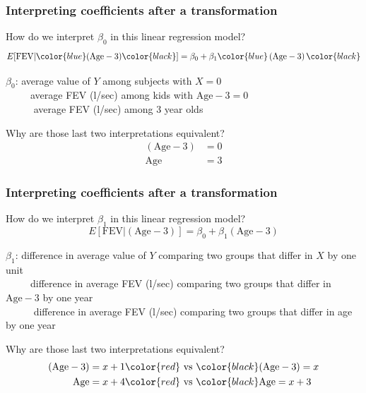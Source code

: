 \documentclass[12pt, 
hyperref={colorlinks=true, linkcolor=blue, urlcolor=cyan}]{beamer}
\begin{document}
\begin{frame}
\frametitle{Interpreting coefficients after a transformation}
How do we interpret $\beta_0$ in this linear regression model? $$E[\text{FEV}|\color{blue}(\text{Age}-3)\color{black}] = \beta_0 + \beta_1 \color{blue}\left(\text{Age}-3\right)\color{black}$$

\vspace{-0.5cm}
$\beta_0$: average value of $Y$ among subjects with $X = 0$ \\ \pause
\ \ \ \ \ average FEV (l/sec) among kids with $\text{Age} -3 = 0$\\ \pause
\ \ \ \ \ \color{blue} average FEV (l/sec) among 3 year olds \color{black} \pause

Why are those last two interpretations equivalent?
\begin{align*}
(\text{Age}-3) &= 0 \\ 
\text{Age} &= 3
\end{align*}
\end{frame}

\begin{frame}
\frametitle{Interpreting coefficients after a transformation}
How do we interpret $\beta_1$ in this linear regression model? $$E[\text{FEV}|(\text{Age}-3)] = \beta_0 + \beta_1 \left(\text{Age}-3\right)$$

\vspace{-0.5cm}
$\beta_1$: difference in average value of $Y$ comparing two groups that differ in $X$ by one unit\\ \pause
\ \ \ \ \ difference in average FEV (l/sec) comparing two groups that differ in $\text{Age}-3$ by one year\\ \pause
\ \ \ \ \ \color{blue} difference in average FEV (l/sec) comparing two groups that differ in age by one year \color{black}\pause

Why are those last two interpretations equivalent?
\begin{align*}
(\text{Age}-3) = x+1 &\color{red} \text{ vs } \color{black} (\text{Age}-3) = x \\
\text{Age} = x+4 &\color{red} \text{ vs } \color{black} \text{Age} = x+3
\end{align*}
\end{frame}
\end{document}
